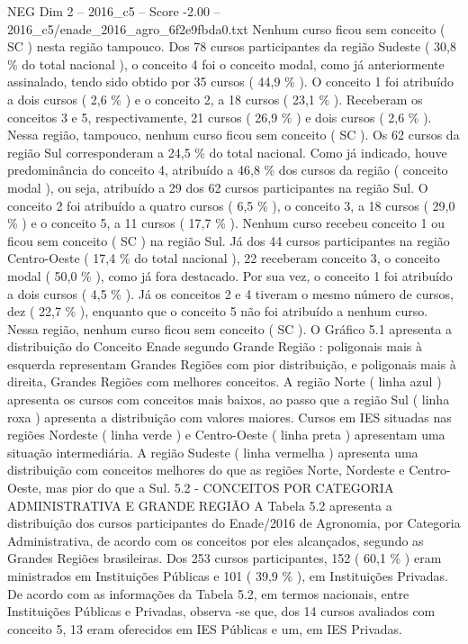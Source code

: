 \begin{textsample}{NEG Dim 2 – 2016\_c5 – Score -2.00 – 2016\_c5/enade\_2016\_agro\_6f2e9fbda0.txt}
Nenhum curso ficou sem conceito ( SC ) nesta região tampouco.
Dos 78 cursos participantes da região Sudeste ( 30,8 \% do total nacional ), o conceito 4 foi o conceito modal, como já anteriormente assinalado, tendo sido obtido por 35 cursos ( 44,9 \% ).
O conceito 1 foi atribuído a dois cursos ( 2,6 \% ) e o conceito 2, a 18 cursos ( 23,1 \% ).
Receberam os conceitos 3 e 5, respectivamente, 21 cursos ( 26,9 \% ) e dois cursos ( 2,6 \% ).
Nessa região, tampouco, nenhum curso ficou sem conceito ( SC ).
Os 62 cursos da região Sul corresponderam a 24,5 \% do total nacional.
Como já indicado, houve predominância do conceito 4, atribuído a 46,8 \% dos cursos da região ( conceito modal ), ou seja, atribuído a 29 dos 62 cursos participantes na região Sul.
O conceito 2 foi atribuído a quatro cursos ( 6,5 \% ), o conceito 3, a 18 cursos ( 29,0 \% ) e o conceito 5, a 11 cursos ( 17,7 \% ).
Nenhum curso recebeu conceito 1 ou ficou sem conceito ( SC ) na região Sul.
Já dos 44 cursos participantes na região Centro-Oeste ( 17,4 \% do total nacional ), 22 receberam conceito 3, o conceito modal ( 50,0 \% ), como já fora destacado.
Por sua vez, o conceito 1 foi atribuído a dois cursos ( 4,5 \% ).
Já os conceitos 2 e 4 tiveram o mesmo número de cursos, dez ( 22,7 \% ), enquanto que o conceito 5 não foi atribuído a nenhum curso.
Nessa região, nenhum curso ficou sem conceito ( SC ).
O Gráfico 5.1 apresenta a distribuição do Conceito Enade segundo Grande Região : poligonais mais à esquerda representam Grandes Regiões com pior distribuição, e poligonais mais à direita, Grandes Regiões com melhores conceitos.
A região Norte ( linha azul ) apresenta os cursos com conceitos mais baixos, ao passo que a região Sul ( linha roxa ) apresenta a distribuição com valores maiores.
Cursos em IES situadas nas regiões Nordeste ( linha verde ) e Centro-Oeste ( linha preta ) apresentam uma situação intermediária.
A região Sudeste ( linha vermelha ) apresenta uma distribuição com conceitos melhores do que as regiões Norte, Nordeste e Centro-Oeste, mas pior do que a Sul. 5.2 - CONCEITOS POR CATEGORIA ADMINISTRATIVA E GRANDE REGIÃO A Tabela 5.2 apresenta a distribuição dos cursos participantes do Enade/2016 de Agronomia, por Categoria Administrativa, de acordo com os conceitos por eles alcançados, segundo as Grandes Regiões brasileiras.
Dos 253 cursos participantes, 152 ( 60,1 \% ) eram ministrados em Instituições Públicas e 101 ( 39,9 \% ), em Instituições Privadas.
De acordo com as informações da Tabela 5.2, em termos nacionais, entre Instituições Públicas e Privadas, observa -se que, dos 14 cursos avaliados com conceito 5, 13 eram oferecidos em IES Públicas e um, em IES Privadas.

\end{textsample}
